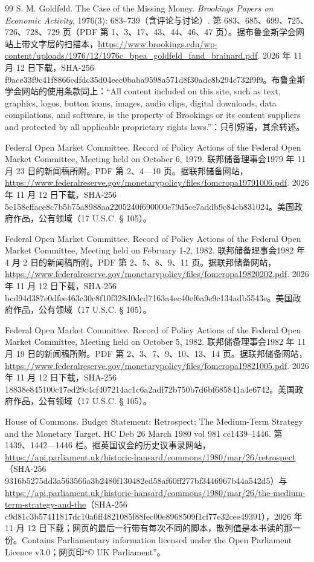 \begin{thebibliography}{99}
 S. M. Goldfeld. The Case of the Missing Money. \emph{Brookings Papers on Economic Activity}, 1976(3): 683--739（含评论与讨论）. 第 683、685、699、725、726、728、729 页（PDF 第 1、3、17、43、44、46、47 页）。据布鲁金斯学会网站上带文字层的扫描本，\url{https://www.brookings.edu/wp-content/uploads/1976/12/1976c_bpea_goldfeld_fand_brainard.pdf}. 2026 年 11 月 12 日下载，SHA-256 f9ace33f9c41f8866cdfdc35d04eec0baba9598a571d8f30adc8b294c732f9f9。布鲁金斯学会网站的使用条款同上：“All content included on this site, such as text, graphics, logos, button icons, images, audio clips, digital downloads, data compilations, and software, is the property of Brookings or its content suppliers and protected by all applicable proprietary rights laws.”：只引短语，其余转述。

 Federal Open Market Committee. Record of Policy Actions of the Federal Open Market Committee, Meeting held on October 6, 1979. 联邦储备理事会1979 年 11 月 23 日的新闻稿所附。PDF 第 2、4—10 页。据联邦储备网站，\url{https://www.federalreserve.gov/monetarypolicy/files/fomcropa19791006.pdf}. 2026 年 11 月 12 日下载，SHA-256 5e158efface8c7b5b75a8988aa2205240f690000e79d5ce7addb9c84cb831024。美国政府作品，公有领域（17 U.S.C. § 105）。

 Federal Open Market Committee. Record of Policy Actions of the Federal Open Market Committee, Meeting held on February 1-2, 1982. 联邦储备理事会1982 年 4 月 2 日的新闻稿所附。PDF 第 2、5、8、9、11 页。据联邦储备网站，\url{https://www.federalreserve.gov/monetarypolicy/files/fomcropa19820202.pdf}. 2026 年 11 月 12 日下载，SHA-256 bcd94d387e0dfee463c30c8f10f328d0dcd7163a4ec40ef6a9e9c134adb5543e。美国政府作品，公有领域（17 U.S.C. § 105）。

 Federal Open Market Committee. Record of Policy Actions of the Federal Open Market Committee, Meeting held on October 5, 1982. 联邦储备理事会1982 年 11 月 19 日的新闻稿所附。PDF 第 2、3、7、9、10、13、14 页。据联邦储备网站，\url{https://www.federalreserve.gov/monetarypolicy/files/fomcropa19821005.pdf}. 2026 年 11 月 12 日下载，SHA-256 18838e845100c17ed29c4cf407214ac1c6a2adf72b750b7d6bf685841a4e6742。美国政府作品，公有领域（17 U.S.C. § 105）。

 House of Commons. Budget Statement: Retrospect; The Medium-Term Strategy and the Monetary Target. HC Deb 26 March 1980 vol 981 cc1439--1446. 第 1439、1442—1446 栏。据英国议会的历史议事录网站，\url{https://api.parliament.uk/historic-hansard/commons/1980/mar/26/retrospect}（SHA-256 9316b5275dd3a563566a3b2480f130482ed58af60ff277bf3446967b44a542d5）与 \url{https://api.parliament.uk/historic-hansard/commons/1980/mar/26/the-medium-term-strategy-and-the}（SHA-256 c9d81c3b57411817dc10a6ff4821085f88fec00e8968509f1cf77e32cee49391），2026 年 11 月 12 日下载；网页的最后一行带有每次不同的脚本，散列值是本书读的那一份。Contains Parliamentary information licensed under the Open Parliament Licence v3.0；网页印“© UK Parliament”。


\end{thebibliography}
